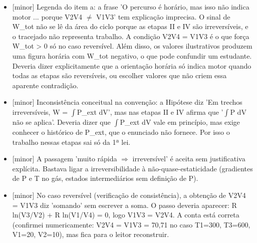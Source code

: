 \documentclass{article}%
\begin{document}
\begin{itemize}%
\item%
{[}minor{]} Legenda do item a: a frase 'O percurso é horário, mas isso não indica motor ... porque V2V4 $\neq$ V1V3' tem explicação imprecisa. O sinal de W\_tot não se lê da área do ciclo porque as etapas II e IV são irreversíveis, e o tracejado não representa trabalho. A condição V2V4 = V1V3 é o que força W\_tot > 0 só no caso reversível. Além disso, os valores ilustrativos produzem uma figura horária com W\_tot negativo, o que pode confundir um estudante. Deveria dizer explicitamente que a orientação horária só indica motor quando todas as etapas são reversíveis, ou escolher valores que não criem essa aparente contradição.%
\item%
{[}minor{]} Inconsistência conceitual na convenção: a Hipótese diz 'Em trechos irreversíveis, W = $\int$P\_ext dV', mas nas etapas II e IV afirma que '$\int$P dV não se aplica'. Deveria dizer que $\int$P\_ext dV vale em princípio, mas exige conhecer o histórico de P\_ext, que o enunciado não fornece. Por isso o trabalho nessas etapas sai só da 1ª lei.%
\item%
{[}minor{]} A passagem 'muito rápida $\Rightarrow$ irreversível' é aceita sem justificativa explícita. Bastava ligar a irreversibilidade à não{-}quase{-}estaticidade (gradientes de P e T no gás, estados intermediários sem definição de P).%
\item%
{[}minor{]} No caso reversível (verificação de consistência), a obtenção de V2V4 = V1V3 diz 'somando' sem escrever a soma. O passo deveria aparecer: R ln(V3/V2) + R ln(V1/V4) = 0, logo V1V3 = V2V4. A conta está correta (confirmei numericamente: V2V4 = V1V3 = 70,71 no caso T1=300, T3=600, V1=20, V2=10), mas fica para o leitor reconstruir.%
\end{itemize}%
\end{document}
